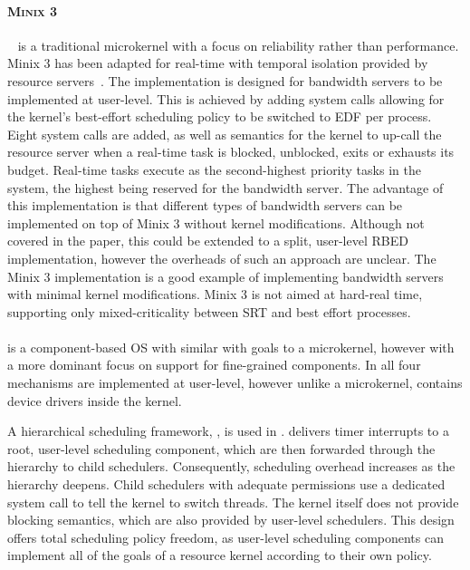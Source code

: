 \paragraph{\textsc{Minix 3}}~\citep{Herder_BGHT_06} is a traditional microkernel with a focus on
reliability rather than performance.  {\sc Minix 3} has been adapted for real-time with temporal
isolation provided by resource servers~\citep{Mancina_LFHGT_09}.  The implementation is designed for
bandwidth servers to be implemented at user-level.  This is achieved by adding system calls allowing
for the kernel's best-effort scheduling policy to be switched to \gls{EDF} per process.  Eight
system calls are added, as well as semantics for the kernel to up-call the resource server when a
real-time task is blocked, unblocked, exits or exhausts its budget.  Real-time tasks execute as the
second-highest priority tasks in the system, the highest being reserved for the bandwidth server.
The advantage of this implementation is that different types of bandwidth servers can be implemented
on top of {\sc Minix 3} without kernel modifications.  Although not covered in the paper, this could
be extended to a split, user-level \gls{RBED} implementation, however the overheads of such an
approach are unclear.  The {\sc Minix 3} implementation is a good example of implementing bandwidth
servers with minimal kernel modifications.  {\sc Minix 3} is not aimed at hard-real time, supporting
only mixed-criticality between \gls{SRT} and best effort processes.

\paragraph{\composite} is a component-based \gls{OS} with similar with goals to a microkernel,
however with a more dominant focus on support for fine-grained components.  In \composite all four
mechanisms are implemented at user-level, however unlike a microkernel, \composite contains device
drivers inside the kernel.

A hierarchical scheduling framework, \hires\citep{Parmer_West_11}, is used in \composite.  \hires
delivers timer interrupts to a root, user-level scheduling component, which are then forwarded
through the hierarchy to child schedulers.  Consequently, scheduling overhead increases as the
hierarchy deepens.  Child schedulers with adequate permissions use a dedicated system call to tell
the kernel to switch threads.  The kernel itself does not provide blocking semantics, which are also
provided by user-level schedulers.  This design offers total scheduling policy freedom, as
user-level scheduling components can implement all of the goals of a resource kernel according to
their own policy.
 
